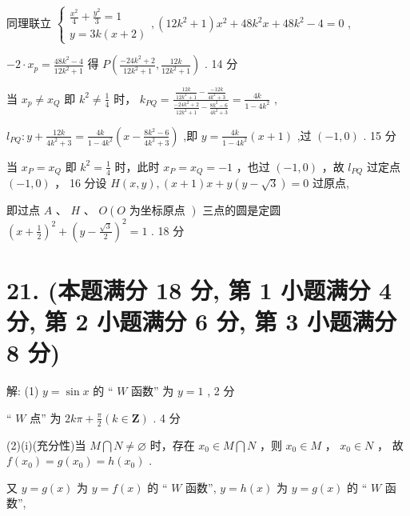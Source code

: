 \documentclass[10pt]{article}
\newcommand*\circled[1]{\tikz[baseline=(char.base)]{\node[shape=circle,draw,inner sep=1.5pt] (char) {\small #1};}}
\begin{document}
同理联立 \(\left\{  {\begin{array}{l} \frac{{x}^{2}}{4} + \frac{{y}^{2}}{3} = 1 \\  y = {3k}\left( {x + 2}\right)  \end{array},\left( {{12}{k}^{2} + 1}\right) {x}^{2} + {48}{k}^{2}x + {48}{k}^{2} - 4 = 0}\right.\) ,

\(- 2 \cdot  {x}_{p} = \frac{{48}{k}^{2} - 4}{{12}{k}^{2} + 1}\) 得 \(P\left( {\frac{-{24}{k}^{2} + 2}{{12}{k}^{2} + 1},\frac{12k}{{12}{k}^{2} + 1}}\right)\) . 14 分

 \circled{1}  当 \({x}_{p} \neq  {x}_{Q}\) 即 \({k}^{2} \neq  \frac{1}{4}\) 时， \({k}_{PQ} = \frac{\frac{12k}{{12}{k}^{2} + 1} - \frac{-{12k}}{4{k}^{2} + 3}}{\frac{-{24}{k}^{2} + 2}{{12}{k}^{2} + 1} - \frac{8{k}^{2} - 6}{4{k}^{2} + 3}} = \frac{4k}{1 - 4{k}^{2}}\) ,

\({l}_{PQ} : y + \frac{12k}{4{k}^{2} + 3} = \frac{4k}{1 - 4{k}^{2}}\left( {x - \frac{8{k}^{2} - 6}{4{k}^{2} + 3}}\right)\) ,即 \(y = \frac{4k}{1 - 4{k}^{2}}\left( {x + 1}\right)\) ,过 \(\left( {-1,0}\right)\) . 15 分

 \circled{2}  当 \({x}_{P} = {x}_{Q}\) 即 \({k}^{2} = \frac{1}{4}\) 时，此时 \({x}_{P} = {x}_{Q} =  - 1\) ，也过 \(\left( {-1,0}\right)\) ，故 \({l}_{PQ}\) 过定点 \(\left( {-1,0}\right)\) ， 16 分设 \(H\left( {x,y}\right) ,\left( {x + 1}\right) x + y\left( {y - \sqrt{3}}\right)  = 0\) 过原点,

即过点 \(A\text{ 、 }H\text{ 、 }O\left( {O\text{ 为坐标原点 }}\right)\) 三点的圆是定圆 \({\left( x + \frac{1}{2}\right) }^{2} + {\left( y - \frac{\sqrt{3}}{2}\right) }^{2} = 1\) . 18 分

\section*{21. (本题满分 18 分, 第 1 小题满分 4 分, 第 2 小题满分 6 分, 第 3 小题满分 8 分)}

解: (1) \(y = \sin x\) 的 “ \(W\) 函数” 为 \(y = 1\) , 2 分

“ \(W\) 点” 为 \({2k\pi } + \frac{\pi }{2}\left( {k \in  \mathbf{Z}}\right)\) . 4 分

(2)(i)(充分性)当 \(M\bigcap N \neq  \varnothing\) 时，存在 \({x}_{0} \in  M\bigcap N\) ，则 \({x}_{0} \in  M\) ， \({x}_{0} \in  N\) ， 故 \(f\left( {x}_{0}\right)  = g\left( {x}_{0}\right)  = h\left( {x}_{0}\right)\) .

又 \(y = g\left( x\right)\) 为 \(y = f\left( x\right)\) 的 “ \(W\) 函数”, \(y = h\left( x\right)\) 为 \(y = g\left( x\right)\) 的 “ \(W\) 函数”,
\end{document}
